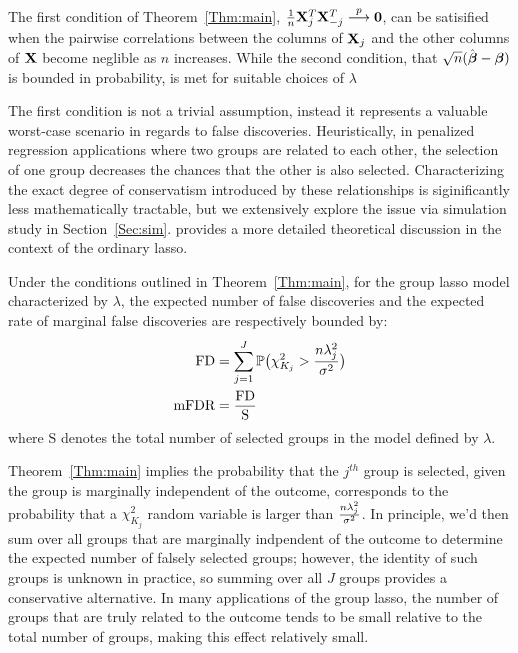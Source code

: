 The first condition of Theorem~\ref{Thm:main}, $\tfrac{1}{n}\mathbf{X}_j^T \mathbf{X}_{-j}^T \overset{p}{\longrightarrow} \mathbf{0}$, can be satisified when the pairwise correlations between the columns of $\mathbf{X}_j$ and the other columns of $\mathbf{X}$ become neglible as $n$ increases. While the second condition, that $\sqrt{n}(\hat{\boldsymbol{\beta}} -  \boldsymbol{\beta})$ is bounded in probability, is met for suitable choices of $\lambda$ \citep{Liu2009}

The first condition is not a trivial assumption, instead it represents a valuable worst-case scenario in regards to false discoveries.  Heuristically, in penalized regression applications where two groups are related to each other, the selection of one group decreases the chances that the other is also selected.  Characterizing the exact degree of conservatism introduced by these relationships is siginificantly less mathematically tractable, but we extensively explore the issue via simulation study in Section~\ref{Sec:sim}.  \citet{Breheny2019} provides a more detailed theoretical discussion in the context of the ordinary lasso.

\begin{clry}
Under the conditions outlined in Theorem~\ref{Thm:main}, for the group lasso model characterized by $\lambda$, the expected number of false discoveries and the expected rate of marginal false discoveries are respectively bounded by:
\begin{align}
  \label{eq:Mfdr}
  \begin{alignedat}{2}
\textrm{FD} &= \sum_{j = 1}^{J} \mathbb{P} \big(\chi^2_{K_j} > \frac{n\lambda_j^2}{\sigma^2}\big)\\
\textrm{mFDR}  &= \frac{\textrm{FD}}{\text{S}} 
  \end{alignedat}
\end{align}
where $\text{S}$ denotes the total number of selected groups in the model defined by $\lambda$.
\end{clry}

Theorem~\ref{Thm:main} implies the probability that the $j^{th}$ group is selected, given the group is marginally independent of the outcome, corresponds to the probability that a $\chi^2_{K_j}$ random variable is larger than $\frac{n\lambda_j^2}{\sigma^2}$.  In principle, we'd then sum over all groups that are marginally indpendent of the outcome to determine the expected number of falsely selected groups; however, the identity of such groups is unknown in practice, so summing over all $J$ groups provides a conservative alternative.  In many applications of the group lasso, the number of groups that are truly related to the outcome tends to be small relative to the total number of groups, making this effect relatively small.

